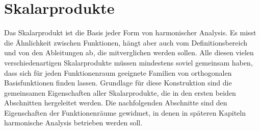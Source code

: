 %
%
%
\chapter{Skalarprodukte
\label{buch:chapter:skalarprodukte}}

Das Skalarprodukt ist die Basis jeder Form von harmonischer Analysis.
Es misst die Ähnlichkeit zwischen Funktionen, hängt aber auch vom
Definitionsbereich und von den Ableitungen ab, die mitverglichen werden
sollen.
Alle diesen vielen verschiedenartigen Skalarprodukte müssen mindestens
soviel gemeinsam haben, dass sich für jeden Funktionenraum geeignete
Familien von orthogonalen Basisfunktionen finden lassen.
Grundlage für diese Konstruktion sind die gemeinsamen Eigenschaften
aller Skalarprodukte, die in den ersten beiden Abschnitten hergeleitet
werden.
Die nachfolgenden Abschnitte sind den Eigenschaften der
Funktionenräume gewidmet, in denen in späteren Kapiteln harmonische
Analysis betrieben werden soll.









